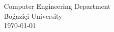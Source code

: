 \begin{titlepage}
    \begin{center}
        \vspace*{1cm}
        
        \Huge
          \textbf{\courseName}
        
        \vspace{0.5cm}
        \LARGE
        
        \vspace{1.5cm}
        
        \textbf{\authorFullName}
        
        \vspace{1 cm}
        \authorSchoolNumber
   		  \vspace{1.5cm}
       
        \vfill
        
        
        \vspace{0.8cm}
          \Large
        Computer Engineering Department\\
        Boğaziçi University\\
        \vspace{0.5cm}
       \today{\year{}}
    \end{center}
\end{titlepage}